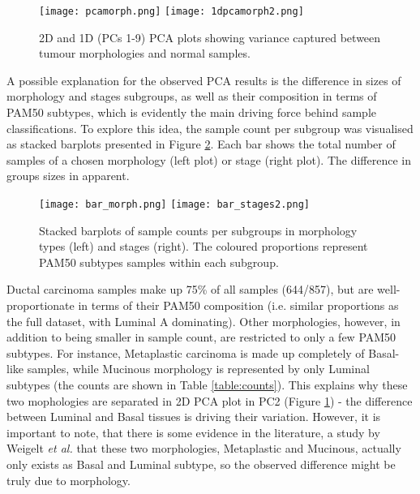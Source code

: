             \begin{figure}[!h]
            \centering
            \hspace*{\fill}
            \texttt{[image: pcamorph.png]}\hfill
            \texttt{[image: 1dpcamorph2.png]}
            \hspace*{\fill}
            \caption{2D and 1D (PCs 1-9) PCA plots showing variance captured between tumour morphologies and normal samples.}
            \label{fig:1dpcamorph}
            \end{figure}

    
    \newpage
    A possible explanation for the observed PCA results is the difference in sizes of morphology and stages subgroups, as well as their composition in terms of PAM50 subtypes, which is evidently the main driving force behind sample classifications. To explore this idea, the sample count per subgroup was visualised as stacked barplots presented in Figure \ref{fig:barms}. Each bar shows the total number of samples of a chosen morphology (left plot) or stage (right plot). The difference in groups sizes in apparent.
       
        \begin{figure}[!h]
        \texttt{[image: bar\_morph.png]}\hfill
        \texttt{[image: bar\_stages2.png]}
        \caption{Stacked barplots of sample counts per subgroups in morphology types (left) and stages (right). The coloured proportions represent PAM50 subtypes samples within each subgroup.}
        \label{fig:barms}
        \end{figure}
        
    Ductal carcinoma samples make up 75\% of all samples (644/857), but are well-proportionate in terms of their PAM50 composition (i.e. similar proportions as the full dataset, with Luminal A dominating). Other morphologies, however, in addition to being smaller in sample count, are restricted to only a few PAM50 subtypes. For instance, Metaplastic carcinoma is made up completely of Basal-like samples, while Mucinous morphology is represented by only Luminal subtypes (the counts are shown in Table \ref{table:counts}). This explains why these two mophologies are separated in 2D PCA plot in PC2 (Figure \ref{fig:1dpcamorph}) - the difference between Luminal and Basal tissues is driving their variation. However, it is important to note, that there is some evidence in the literature, a study by Weigelt \textit{et al.} \cite{Weigelt2010a} that these two morphologies, Metaplastic and Mucinous, actually only exists as Basal and Luminal subtype, so the observed difference might be truly due to morphology.  
    
